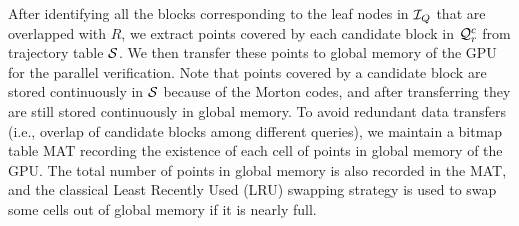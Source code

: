 \documentclass[10pt,conference,letterpaper]{IEEEtran}
\newcommand{\rangeq}{{{\cal Q}_r}\xspace}
\newcommand{\rangecand}{{{\cal Q}_r^c}\xspace}
\newcommand{\trajtable}{{\cal S}\xspace}
\newcommand{\treeindex}{{{\cal I}_Q}\xspace}
\begin{document}
After identifying all the blocks corresponding to the leaf nodes in $\treeindex$ that are overlapped with $R$, we extract points covered by each candidate block in $\rangecand$ from trajectory table $\trajtable$. We then transfer these points to global memory of the GPU for the parallel verification. Note that points covered by a candidate block are stored continuously in $\trajtable$ because of the Morton codes, and after transferring they are still stored continuously in global memory.
To avoid redundant data transfers (i.e., overlap of candidate blocks among different queries), we maintain a bitmap table MAT recording the existence of each cell of points in global memory of the GPU.
The total number of points in global memory is also recorded in the MAT, and the classical Least Recently Used (LRU) swapping strategy is used to swap some cells out of global memory if it is nearly full.
\end{document}
